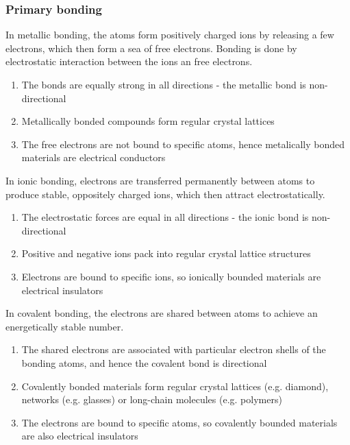 \documentclass{article}
\begin{document}
\subsubsection{Primary bonding}

\begin{definition}
    In metallic bonding, the atoms form positively charged ions by releasing a few electrons, which then form a sea of free electrons. Bonding is done by electrostatic interaction between the ions an free electrons.

    \begin{enumerate}
        \item The bonds are equally strong in all directions - the metallic bond is non-directional
        \item Metallically bonded compounds form regular crystal lattices
        \item The free electrons are not bound to specific atoms, hence metalically bonded materials are electrical conductors
    \end{enumerate}
\end{definition}

\begin{definition}
    In ionic bonding, electrons are transferred permanently between atoms to produce stable, oppositely charged ions, which then attract electrostatically.

    \begin{enumerate}
        \item The electrostatic forces are equal in all directions - the ionic bond is non-directional
        \item Positive and negative ions pack into regular crystal lattice structures
        \item Electrons are bound to specific ions, so ionically bounded materials are electrical insulators
    \end{enumerate}
\end{definition}

\begin{definition}
    In covalent bonding, the electrons are shared between atoms to achieve an energetically stable number.

    \begin{enumerate}
        \item The shared electrons are associated with particular electron shells of the bonding atoms, and hence the covalent bond is directional
        \item Covalently bonded materials form regular crystal lattices (e.g. diamond), networks (e.g. glasses) or long-chain molecules (e.g. polymers)
        \item The electrons are bound to specific atoms, so covalently bounded materials are also electrical insulators
    \end{enumerate}
\end{definition}
\end{document}
